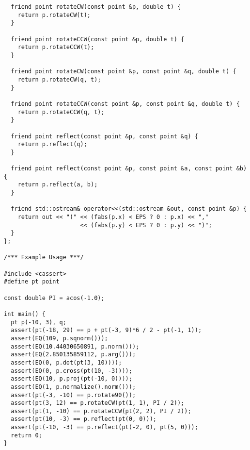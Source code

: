 \begin{lstlisting}
  friend point rotateCW(const point &p, double t) {
    return p.rotateCW(t);
  }

  friend point rotateCCW(const point &p, double t) {
    return p.rotateCCW(t);
  }

  friend point rotateCW(const point &p, const point &q, double t) {
    return p.rotateCW(q, t);
  }

  friend point rotateCCW(const point &p, const point &q, double t) {
    return p.rotateCCW(q, t);
  }

  friend point reflect(const point &p, const point &q) {
    return p.reflect(q);
  }

  friend point reflect(const point &p, const point &a, const point &b) {
    return p.reflect(a, b);
  }

  friend std::ostream& operator<<(std::ostream &out, const point &p) {
    return out << "(" << (fabs(p.x) < EPS ? 0 : p.x) << ","
                      << (fabs(p.y) < EPS ? 0 : p.y) << ")";
  }
};

/*** Example Usage ***/

#include <cassert>
#define pt point

const double PI = acos(-1.0);

int main() {
  pt p(-10, 3), q;
  assert(pt(-18, 29) == p + pt(-3, 9)*6 / 2 - pt(-1, 1));
  assert(EQ(109, p.sqnorm()));
  assert(EQ(10.44030650891, p.norm()));
  assert(EQ(2.850135859112, p.arg()));
  assert(EQ(0, p.dot(pt(3, 10))));
  assert(EQ(0, p.cross(pt(10, -3))));
  assert(EQ(10, p.proj(pt(-10, 0))));
  assert(EQ(1, p.normalize().norm()));
  assert(pt(-3, -10) == p.rotate90());
  assert(pt(3, 12) == p.rotateCW(pt(1, 1), PI / 2));
  assert(pt(1, -10) == p.rotateCCW(pt(2, 2), PI / 2));
  assert(pt(10, -3) == p.reflect(pt(0, 0)));
  assert(pt(-10, -3) == p.reflect(pt(-2, 0), pt(5, 0)));
  return 0;
}
\end{lstlisting}
